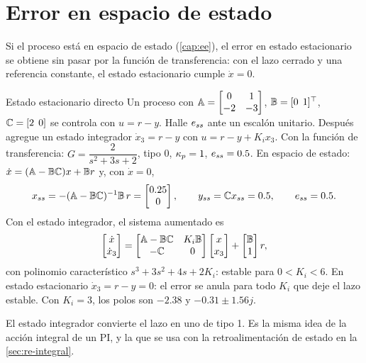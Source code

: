 \section{Error en espacio de estado}
\label{sec:er-estado}

Si el proceso está en espacio de estado (\cref{cap:ee}), el error en estado estacionario se obtiene sin pasar por la función de transferencia: con el lazo cerrado y una referencia constante, el estado estacionario cumple $\dot x=0$.

\begin{ejemplo}[label=ej:er-estado]{Estado estacionario directo}
Un proceso con $\mathbb{A}=\begin{bmatrix}0&1\\-2&-3\end{bmatrix}$, $\mathbb{B}=[0\;\,1]^\top$, $\mathbb{C}=[2\;\,0]$ se controla con $u=r-y$. Halle $e_{ss}$ ante un escalón unitario. Después agregue un estado integrador $\dot x_3=r-y$ con $u=r-y+K_ix_3$.
\solucion Con la función de transferencia: $G=\dfrac{2}{s^2+3s+2}$, tipo 0, $\kappa_p=1$, $e_{ss}=0.5$. En espacio de estado: $\dot x=(\mathbb{A}-\mathbb{B}\mathbb{C})x+\mathbb{B} r$ y, con $\dot x=0$,
\[
  x_{ss}=-(\mathbb{A}-\mathbb{B}\mathbb{C})^{-1}\mathbb{B}\,r=\begin{bmatrix}0.25\\0\end{bmatrix},\qquad y_{ss}=\mathbb{C} x_{ss}=0.5,\qquad e_{ss}=0.5 .
\]
Con el estado integrador, el sistema aumentado es
\[
  \begin{bmatrix}\dot x\\\dot x_3\end{bmatrix}=
  \begin{bmatrix}\mathbb{A}-\mathbb{B}\mathbb{C}&K_i\mathbb{B}\\-\mathbb{C}&0\end{bmatrix}\begin{bmatrix}x\\x_3\end{bmatrix}+\begin{bmatrix}\mathbb{B}\\1\end{bmatrix}r,
\]
con polinomio característico $s^3+3s^2+4s+2K_i$: estable para $0<K_i<6$. En estado estacionario $\dot x_3=r-y=0$: el error se anula para todo $K_i$ que deje el lazo estable. Con $K_i=3$, los polos son $-2.38$ y $-0.31\pm1.56j$.
\end{ejemplo}


El estado integrador convierte el lazo en uno de tipo 1. Es la misma idea de la acción integral de un PI, y la que se usa con la retroalimentación de estado en la \cref{sec:re-integral}.
